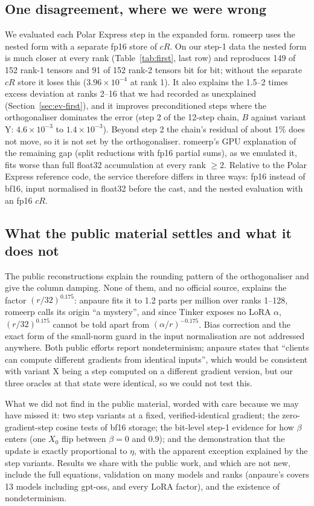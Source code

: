 \documentclass[11pt]{article}
\begin{document}
\subsection{One disagreement, where we were wrong}
We evaluated each Polar Express step in the expanded form. romeerp uses the nested form with a
separate fp16 store of $cR$. On our step-1 data the nested form is much closer at every rank
(Table~\ref{tab:first}, last row) and reproduces 149 of 152 rank-1 tensors and 91 of 152 rank-2 tensors
bit for bit; without the separate $cR$ store it loses this ($3.96\times10^{-4}$ at rank 1). It also
explains the 1.5--2 times excess deviation at ranks 2--16 that we had recorded as unexplained
(Section~\ref{sec:ev-first}), and it improves preconditioned steps where the orthogonaliser dominates
the error (step 2 of the 12-step chain, $B$ against variant Y: $4.6\times10^{-3}$ to $1.4\times10^{-3}$).
Beyond step 2 the chain's residual of about 1\% does not move, so it is not set by the orthogonaliser.
romeerp's GPU explanation of the remaining gap (split reductions with fp16 partial sums), as we
emulated it, fits worse than full float32 accumulation at every rank $\ge2$. Relative to the Polar
Express reference code, the service therefore differs in three ways: fp16 instead of bf16, input
normalised in float32 before the cast, and the nested evaluation with an fp16 $cR$.

\subsection{What the public material settles and what it does not}
The public reconstructions explain the rounding pattern of the orthogonaliser and give the column
damping. None of them, and no official source, explains the factor $(r/32)^{0.175}$: anpaure fits it to
1.2 parts per million over ranks 1--128, romeerp calls its origin ``a mystery'', and since Tinker
exposes no LoRA $\alpha$, $(r/32)^{0.175}$ cannot be told apart from $(\alpha/r)^{-0.175}$. Bias
correction and the exact form of the small-norm guard in the input normalisation are not addressed
anywhere. Both public efforts report nondeterminism; anpaure states that ``clients can compute
different gradients from identical inputs'', which would be consistent with variant X being a step
computed on a different gradient version, but our three oracles at that state were identical, so we
could not test this.

What we did not find in the public material, worded with care because we may have missed it: two
step variants at a fixed, verified-identical gradient; the zero-gradient-step cosine tests of bf16
storage; the bit-level step-1 evidence for how $\beta$ enters (one $X_0$ flip between $\beta=0$ and
$0.9$); and the demonstration that the update is exactly proportional to $\eta$, with the apparent
exception explained by the step variants. Results we share with the public work, and which are not
new, include the full equations, validation on many models and ranks (anpaure's covers 13 models
including gpt-oss, and every LoRA factor), and the existence of nondeterminism.
\end{document}
